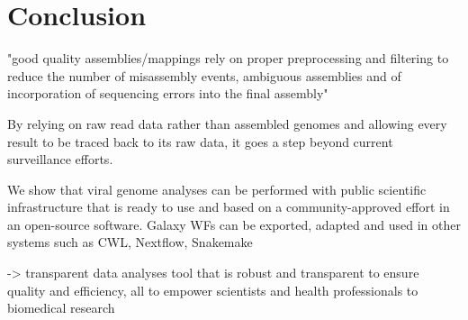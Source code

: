 \chapter{Conclusion}\label{chap:conclusion}
\todoit

"good quality assemblies/mappings rely on proper preprocessing and filtering to reduce the number of misassembly events, ambiguous assemblies and of incorporation of sequencing errors into the final assembly"

By relying on raw read data rather than assembled genomes and allowing every result to be traced back to its raw data, it goes a step beyond current surveillance efforts.

We show that viral genome analyses can be performed with public scientific infrastructure that is ready to use and based on a community-approved effort in an open-source software.
Galaxy WFs can be exported, adapted and used in other systems such as CWL, Nextflow, Snakemake

-> transparent data analyses tool that is robust and transparent to ensure quality and efficiency, all to empower scientists and health professionals to biomedical research